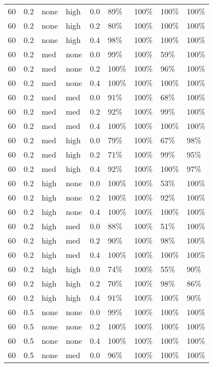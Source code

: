 \begin{longtable}{rrllrllll}
  60 & 0.2 & none & high & 0.0 & 89\% & 100\% & 100\% & 100\% \\ 
  60 & 0.2 & none & high & 0.2 & 80\% & 100\% & 100\% & 100\% \\ 
  60 & 0.2 & none & high & 0.4 & 98\% & 100\% & 100\% & 100\% \\ 
  60 & 0.2 & med & none & 0.0 & 99\% & 100\% & 59\% & 100\% \\ 
  60 & 0.2 & med & none & 0.2 & 100\% & 100\% & 96\% & 100\% \\ 
  60 & 0.2 & med & none & 0.4 & 100\% & 100\% & 100\% & 100\% \\ 
  60 & 0.2 & med & med & 0.0 & 91\% & 100\% & 68\% & 100\% \\ 
  60 & 0.2 & med & med & 0.2 & 92\% & 100\% & 99\% & 100\% \\ 
  60 & 0.2 & med & med & 0.4 & 100\% & 100\% & 100\% & 100\% \\ 
  60 & 0.2 & med & high & 0.0 & 79\% & 100\% & 67\% & 98\% \\ 
  60 & 0.2 & med & high & 0.2 & 71\% & 100\% & 99\% & 95\% \\ 
  60 & 0.2 & med & high & 0.4 & 92\% & 100\% & 100\% & 97\% \\ 
  60 & 0.2 & high & none & 0.0 & 100\% & 100\% & 53\% & 100\% \\ 
  60 & 0.2 & high & none & 0.2 & 100\% & 100\% & 92\% & 100\% \\ 
  60 & 0.2 & high & none & 0.4 & 100\% & 100\% & 100\% & 100\% \\ 
  60 & 0.2 & high & med & 0.0 & 88\% & 100\% & 51\% & 100\% \\ 
  60 & 0.2 & high & med & 0.2 & 90\% & 100\% & 98\% & 100\% \\ 
  60 & 0.2 & high & med & 0.4 & 100\% & 100\% & 100\% & 100\% \\ 
  60 & 0.2 & high & high & 0.0 & 74\% & 100\% & 55\% & 90\% \\ 
  60 & 0.2 & high & high & 0.2 & 70\% & 100\% & 98\% & 86\% \\ 
  60 & 0.2 & high & high & 0.4 & 91\% & 100\% & 100\% & 90\% \\ 
  60 & 0.5 & none & none & 0.0 & 99\% & 100\% & 100\% & 100\% \\ 
  60 & 0.5 & none & none & 0.2 & 100\% & 100\% & 100\% & 100\% \\ 
  60 & 0.5 & none & none & 0.4 & 100\% & 100\% & 100\% & 100\% \\ 
  60 & 0.5 & none & med & 0.0 & 96\% & 100\% & 100\% & 100\% \\ 

\end{longtable}
